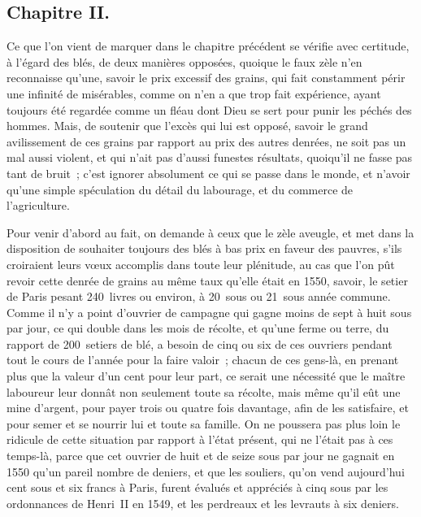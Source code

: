 \documentclass[french,twoside]{book} %
\begin{document}
\subsection[{Chapitre II.}]{Chapitre II.}
\noindent Ce que l’on vient de marquer dans le chapitre précédent se vérifie avec certitude, à l’égard des blés, de deux manières opposées, quoique le faux zèle n’en reconnaisse qu’une, savoir le prix excessif des grains, qui fait constamment périr une infinité de misérables, comme on n’en a que trop fait expérience, ayant toujours été regardée comme un fléau dont Dieu se sert pour punir les péchés des hommes. Mais, de soutenir que l’excès qui lui est opposé, savoir le grand avilissement de ces grains par rapport au prix des autres denrées, ne soit pas un mal aussi violent, et qui n’ait pas d’aussi funestes résultats, quoiqu’il ne fasse pas tant de bruit ; c’est ignorer absolument ce qui se passe dans le monde, et n’avoir qu’une simple spéculation du détail du labourage, et du commerce de l’agriculture.\par
Pour venir d’abord au fait, on demande à ceux que le zèle aveugle, et met dans la disposition de souhaiter toujours des blés à bas prix en faveur des pauvres, s’ils croiraient leurs vœux accomplis dans toute leur plénitude, au cas que l’on pût revoir cette denrée de grains au même taux qu’elle était en 1550, savoir, le setier de Paris pesant 240 livres ou environ, à 20 sous ou 21 sous année commune. Comme il n’y a point d’ouvrier de campagne qui gagne moins de sept à huit sous par jour, ce qui double dans les mois de récolte, et qu’une ferme ou terre, du rapport de 200 setiers de blé, a besoin de cinq ou six de ces ouvriers pendant tout le cours de l’année pour la faire valoir ; chacun de ces gens-là, en prenant plus que la valeur d’un cent pour leur part, ce serait une nécessité que le maître laboureur leur donnât non seulement toute sa récolte, mais même qu’il eût une mine d’argent, pour payer trois ou quatre fois davantage, afin de les satisfaire, et pour semer et se nourrir lui et toute sa famille. On ne poussera pas plus loin le ridicule de cette situation par rapport à l’état présent, qui ne l’était pas à ces temps-là, parce que cet ouvrier de huit et de seize sous par jour ne gagnait en 1550 qu’un pareil nombre de deniers, et que les souliers, qu’on vend aujourd’hui cent sous et six francs à Paris, furent évalués et appréciés à cinq sous par les ordonnances de Henri II en 1549, et les perdreaux et les levrauts à six deniers.\par
\end{document}
